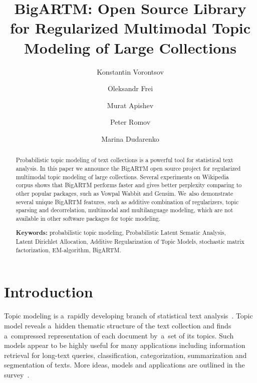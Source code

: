 \documentclass[russian]{llncs}
\begin{document}
\title{
    BigARTM: Open Source Library for
    Regularized Multimodal %
    Topic Modeling of Large Collections
}
\author{
    Konstantin Vorontsov
    \and
    Oleksandr Frei
    \and
    Murat Apishev
    \and
    Peter Romov
    \and
    Marina Dudarenko
}

\maketitle

\begin{abstract}
Probabilistic topic modeling of text collections is a powerful tool for statistical text analysis.
In this paper we announce the \mbox{BigARTM} open source project 
for regularized multimodal topic modeling of large collections.
Several experiments on Wikipedia corpus shows that BigARTM performs faster and gives better perplexity
comparing to other popular packages, such as Vowpal Wabbit and Gensim.
We~also demonstrate several unique BigARTM features, such as 
additive combination of regularizers, 
topic sparsing and decorrelation, 
multimodal and multilanguage modeling,
which are not available in other software packages for topic modeling.

\vspace{1em}
\textbf{Keywords:}
    probabilistic topic modeling,
    Probabilistic Latent Sematic Analysis,
    Latent Dirichlet Allocation,
    Additive Regularization of Topic Models,
    stochastic matrix factorization,
    EM-algorithm,
    BigARTM.
\end{abstract}

\section{Introduction}

Topic modeling is a~rapidly developing branch of statistical text analysis~\cite{blei12ptm}.
Topic model reveals a~hidden thematic structure of the text collection
and finds a~compressed representation of each document by~a~set of its topics.
Such models appear to be highly useful for many applications including
information retrieval for long-text queries,
classification, categorization, summarization and segmentation of texts.
More ideas, models and applications are outlined in the survey~\cite{daud10knowledge}.
\end{document}
